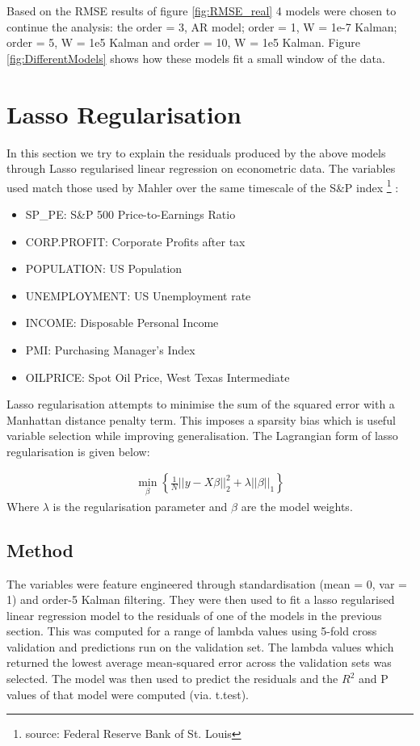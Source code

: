 \documentclass{sig-alternate-05-2015}
\begin{document}
Based on the RMSE results of figure \ref{fig:RMSE_real} 4 models were chosen to continue the analysis: the order = 3, AR model; order = 1, W = 1e-7 Kalman; order = 5, W = 1e5 Kalman and order = 10, W = 1e5 Kalman. Figure \ref{fig:DifferentModels} shows how these models fit a small window of the data.   

\clearpage
\section{Lasso Regularisation}
In this section we try to explain the residuals produced by the above models through Lasso regularised linear regression on econometric data. The variables used match those used by Mahler over the same timescale of the S\&P index \footnote{source: Federal Reserve Bank of St. Louis} \cite{mahler2009modeling}: 
\begin{itemize}
\item SP\_PE: S\&P 500 Price-to-Earnings Ratio 
\item CORP.PROFIT: Corporate Profits after tax
\item POPULATION: US Population
\item UNEMPLOYMENT: US Unemployment rate
\item INCOME: Disposable Personal Income
\item PMI: Purchasing Manager's Index
\item OILPRICE: Spot Oil Price, West Texas Intermediate
\end{itemize}

Lasso regularisation attempts to minimise the sum of the squared error with a Manhattan distance penalty term. This imposes a sparsity bias which is useful variable selection while improving generalisation. The Lagrangian form of lasso regularisation is given below:

\begin{align}
\min_\beta\left\lbrace\frac{1}{N} ||y - X\beta||^2_2 + \lambda||\beta||_1\right\rbrace
\end{align}
Where $\lambda$ is the regularisation parameter and $\beta$ are the model weights. 

\subsection{Method} 
The variables were feature engineered through standardisation (mean = 0, var = 1) and order-5 Kalman filtering. They were then used to fit a lasso regularised linear regression model to the residuals of one of the models in the previous section. This was computed for a range of lambda values using 5-fold cross validation and predictions run on the validation set. The lambda values which returned the lowest average mean-squared error across the validation sets was selected. The model was then used to predict the residuals and the $R^2$ and P values of that model were computed (via. t.test). 
\end{document}
